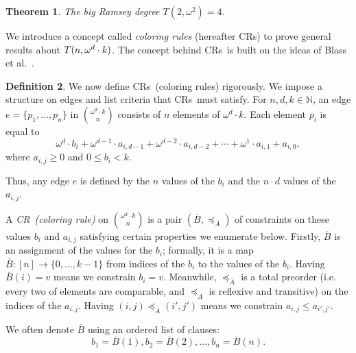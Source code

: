 \documentclass[10pt,a4paper]{article}
\newcommand{\om}{\omega}
\newcommand{\N}{\mathbb{N}}
\newcommand{\crulenospace}{CR}
\newcommand{\cruleLong}{coloring rule}
\newcommand{\crulesLong}{coloring rules}
\newcommand{\crule}{\crulenospace~}
\newcommand{\crules}{\crulenospace s~}
\newcommand{\crulesnospace}{\crulenospace s}
\newcommand{\xleq}{\preceq_{\overline{A}}}
\newcommand{\assny}{\overline{B}}
\newcommand{\numpoints}{n}
\newcommand{\inumpoints}{i}
\newcommand{\idegr}{j}
\newcommand{\commonconst}{a}
\newcommand{\rareconst}{b}
\theoremstyle{plain}
\newtheorem{theorem}{Theorem}[section]
\theoremstyle{definition}
\newtheorem{definition}[theorem]{Definition}
\begin{document}
\begin{theorem}\label{th:om2} 
The big Ramsey degree $T(2,\om^2)=4$.
\end{theorem} 

We introduce a concept called {\it \crulesLong} (hereafter \crulesnospace) to prove 
general results about
\linebreak
$T(\numpoints,\omega^d \cdot\nobreak k)$.
The concept behind \crules is built on the
ideas of Blass et al.~\cite{BDR21}.

\begin{definition}\label{def:coloring-rule}
We now define \crules (\crulesLong) rigorously. We impose a structure on edges and list criteria that \crules must satisfy.
For $\numpoints,d,k \in \N$, an edge $e = \{p_1, \dots, p_{\numpoints}\}$ in $\binom{\om^d \cdot k}{\numpoints}$ consists of $\numpoints$ elements of $\om^d\cdot k$. Each element $p_{\inumpoints} $ is equal to 
$$\om^d \cdot \rareconst_{\inumpoints} + \om^{d-1} \cdot \commonconst_{\inumpoints,d-1} + \om^{d-2} \cdot \commonconst_{\inumpoints,d-2} + \cdots + \om^1 \cdot \commonconst_{\inumpoints,1} + \commonconst_{\inumpoints,0},$$
where $\commonconst_{\inumpoints,\idegr} \geq 0$ and $0\leq \rareconst_{\inumpoints} < k$.

Thus, any edge $e$ is defined by the $\numpoints$ values of the $\rareconst_{\inumpoints}$ and the $\numpoints\cdot d$ values of the $\commonconst_{\inumpoints,\idegr}$. 

A \textit{\crule (\cruleLong)} on $\binom{\om^d \cdot k}{\numpoints}$ is a pair $(\assny,\xleq)$ of constraints on these values $\rareconst_{\inumpoints}$ and $\commonconst_{\inumpoints,\idegr}$ satisfying certain properties we enumerate below. Firstly, $\assny$ is an assignment of the values for the $\rareconst_{\inumpoints}$; formally, it is a map $\assny: [\numpoints] \to \{0,\dots,k-1\}$ from indices of the $\rareconst_{\inumpoints}$ to the values of the $\rareconst_{\inumpoints}$. Having $\assny(\inumpoints) = v$ means we constrain $\rareconst_{\inumpoints} = v$.
Meanwhile, $\xleq$ is a total preorder (i.e. every two of elements are comparable, and $\xleq$ is reflexive and transitive) on the indices of the $\commonconst_{\inumpoints,\idegr}$. Having $(\inumpoints,\idegr) \xleq (\inumpoints',\idegr')$ means we constrain $\commonconst_{\inumpoints,\idegr} \leq \commonconst_{\inumpoints',\idegr'}$.

We often denote $\assny$ using an ordered list of clauses: $$\rareconst_1 = \assny(1), \rareconst_2 = \assny(2), \dots, \rareconst_{\numpoints} = \assny(\numpoints).$$


\end{definition}
\end{document}
